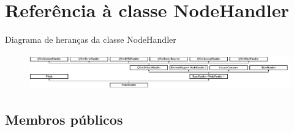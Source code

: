 \hypertarget{class_node_handler}{\section{Referência à classe Node\-Handler}
\label{class_node_handler}
}
Diagrama de heranças da classe Node\-Handler\begin{figure}[H]
\begin{center}
\leavevmode
\includegraphics[height=1.545894cm]{class_node_handler}
\end{center}
\end{figure}
\subsection*{Membros públicos}
